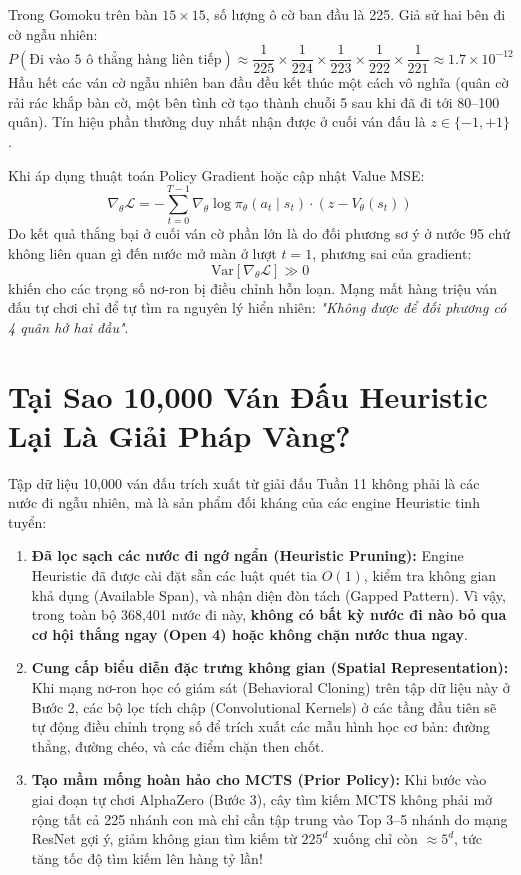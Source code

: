\documentclass[11pt,a4paper]{report}
\begin{document}
Trong Gomoku trên bàn $15 \times 15$, số lượng ô cờ ban đầu là 225. Giả sử hai bên đi cờ ngẫu nhiên:
\begin{equation}
    P(\text{Đi vào 5 ô thẳng hàng liên tiếp}) \approx \frac{1}{225} \times \frac{1}{224} \times \frac{1}{223} \times \frac{1}{222} \times \frac{1}{221} \approx 1.7 \times 10^{-12}
\end{equation}
Hầu hết các ván cờ ngẫu nhiên ban đầu đều kết thúc một cách vô nghĩa (quân cờ rải rác khắp bàn cờ, một bên tình cờ tạo thành chuỗi 5 sau khi đã đi tới 80--100 quân). Tín hiệu phần thưởng duy nhất nhận được ở cuối ván đấu là $z \in \{-1, +1\}$.

Khi áp dụng thuật toán Policy Gradient hoặc cập nhật Value MSE:
\begin{equation}
    \nabla_\theta \mathcal{L} = -\sum_{t=0}^{T-1} \nabla_\theta \log \pi_\theta(a_t \mid s_t) \cdot (z - V_\theta(s_t))
\end{equation}
Do kết quả thắng bại ở cuối ván cờ phần lớn là do đối phương sơ ý ở nước 95 chứ không liên quan gì đến nước mở màn ở lượt $t=1$, phương sai của gradient:
\begin{equation}
    \text{Var}[\nabla_\theta \mathcal{L}] \gg 0
\end{equation}
khiến cho các trọng số nơ-ron bị điều chỉnh hỗn loạn. Mạng mất hàng triệu ván đấu tự chơi chỉ để tự tìm ra nguyên lý hiển nhiên: \textit{"Không được để đối phương có 4 quân hở hai đầu"}.

\section{Tại Sao 10,000 Ván Đấu Heuristic Lại Là Giải Pháp Vàng?}

Tập dữ liệu 10,000 ván đấu trích xuất từ giải đấu Tuần 11 không phải là các nước đi ngẫu nhiên, mà là sản phẩm đối kháng của các engine Heuristic tinh tuyển:
\begin{enumerate}
    \item \textbf{Đã lọc sạch các nước đi ngớ ngẩn (Heuristic Pruning):} Engine Heuristic đã được cài đặt sẵn các luật quét tia $O(1)$, kiểm tra không gian khả dụng (Available Span), và nhận diện đòn tách (Gapped Pattern). Vì vậy, trong toàn bộ 368,401 nước đi này, \textbf{không có bất kỳ nước đi nào bỏ qua cơ hội thắng ngay (Open 4) hoặc không chặn nước thua ngay}.
    \item \textbf{Cung cấp biểu diễn đặc trưng không gian (Spatial Representation):} Khi mạng nơ-ron học có giám sát (Behavioral Cloning) trên tập dữ liệu này ở Bước 2, các bộ lọc tích chập (Convolutional Kernels) ở các tầng đầu tiên sẽ tự động điều chỉnh trọng số để trích xuất các mẫu hình học cơ bản: đường thẳng, đường chéo, và các điểm chặn then chốt.
    \item \textbf{Tạo mầm mống hoàn hảo cho MCTS (Prior Policy):} Khi bước vào giai đoạn tự chơi AlphaZero (Bước 3), cây tìm kiếm MCTS không phải mở rộng tất cả 225 nhánh con mà chỉ cần tập trung vào Top 3--5 nhánh do mạng ResNet gợi ý, giảm không gian tìm kiếm từ $225^d$ xuống chỉ còn $\approx 5^d$, tức tăng tốc độ tìm kiếm lên hàng tỷ lần!

\end{enumerate}
\end{document}
